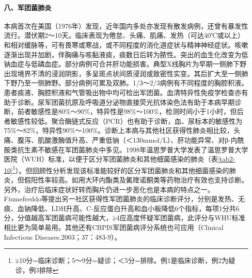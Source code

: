 \paragraph{八、军团菌肺炎}

本病首次在美国（1976年）发现，近年国内多处亦发现有散发病例，还曾有暴发性流行。潜伏期2～10天。临床表现为倦怠、头痛、肌痛、发热（可达40℃或以上）和相对缓脉等，可有畏寒或寒战，或不同程度的消化道症状与精神神经症状。咳嗽逐渐出现并加剧，伴胸痛与咳黏液痰，痰数日后转为脓性。突出的血生化改变为低钠血症与低磷血症。部分病例可合并肝功能损害。典型X线胸片为早期一侧肺下野出现境界不清的浸润阴影，多呈斑点状间质浸润或致密性实变。其后扩大至一侧肺下野乃至一侧肺野。部分病例可累及双肺。1/3～2/3病例有不同程度的胸腔积液。患者痰液、胸腔积液和气管吸出物中均可检出军团菌。血清特异性免疫学检查亦有助于诊断。尿军团菌抗原及呼吸道分泌物直接荧光抗体染色法有助于本病早期诊断，前者敏感性是80\%～90\%，特异性是98\%～100\%，检测时间小于1小时，但后者敏感性较低。聚合酶链式反应（PCR）也有助于诊断，血、尿标本的敏感性为75\%～82\%，特异性90\%～100\%。诊断上本病与其他社区获得性肺炎相比较，头痛、腹泻、肌酸激酶值升高、严重低钠（＜130mmol/L）、肝功能异常、对β-内酰胺类抗生素不敏感在军团菌肺炎中多见。1998年温思罗普大学发表了温思罗普大学医院（WUH）标准，以便于区分军团菌肺炎和其他细菌感染的肺炎（表\ref{tab2-10}\footnote{≥10分=临床诊断；5～9分=疑诊；＜5分=排除。例1是临床诊断，例2为疑诊，例3排除}）。但回顾性分析发现该标准能较好的区分军团菌肺炎和其他细菌感染的肺炎，但假阳性率较高。如用大环内酯类及氟喹诺酮类等药物治疗有效也支持诊断。另外，治疗后临床症状好转而胸片仍进一步恶化也是本病的特点之一。Fiumefreddo等提出另一社区获得性军团菌肺炎的临床诊断评分，分别是发热、无痰、血钠降低、LDH升高、C-反应蛋白升高和血小板降低6个指标，每项1分共6分，分值越高军团菌病可能性越大，≥4应高度怀疑军团菌病，此评分与WHU标准相比更为简单易用。其他还有CBPIS军团菌病评分系统也可应用（Clinical
Infectious Diseases.2003；37：483-9）。

